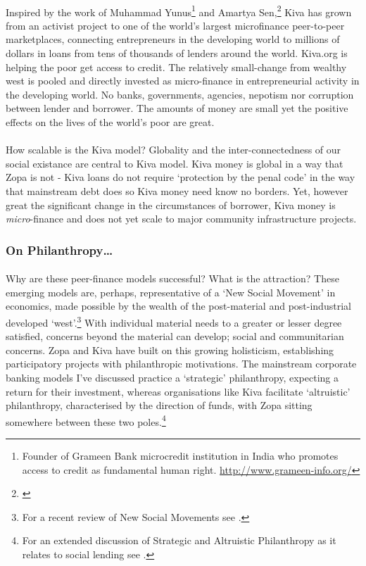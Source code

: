 \documentclass[12pt,a4paper,titlepage]{article}
\begin{document}
\paragraph{}Inspired by the work of Muhammad Yunus\footnote{Founder of Grameen Bank microcredit institution in India who promotes access to credit as fundamental human right. \url{http://www.grameen-info.org/}} and Amartya Sen,\footnote{\cite{sen:1999df}} Kiva has grown from an activist project to one of the world's largest microfinance peer-to-peer marketplaces, connecting entrepreneurs in the developing world to millions of dollars in loans from tens of thousands of lenders around the world. Kiva.org is helping the poor get access to credit. The relatively small-change from wealthy west is pooled and directly invested as micro-finance in entrepreneurial activity in the developing world. No banks, governments, agencies, nepotism nor corruption between lender and borrower. The amounts of money are small yet the positive effects on the lives of the world's poor are great.

\paragraph{}How scalable is the Kiva model? Globality and the inter-connectedness of our social existance are central to Kiva model. Kiva money is global in a way that Zopa is not - Kiva loans do not require `protection by the penal code' in the way that mainstream debt does so Kiva money need know no borders. Yet, however great the significant change in the circumstances of borrower, Kiva money is \textit{micro}-finance and does not yet scale to major community infrastructure projects.

\subsubsection{On Philanthropy\ldots}
\paragraph{}Why are these peer-finance models successful? What is the attraction? These emerging models are, perhaps, representative of a `New Social Movement' in economics, made possible by the wealth of the post-material and post-industrial developed `west'.\footnote{For a recent review of New Social Movements see \cite{Porta:2006kx}.} With individual material needs to a greater or lesser degree satisfied, concerns beyond the material can develop; social and communitarian concerns. Zopa and Kiva have built on this growing holisticism, establishing participatory projects with philanthropic motivations. The mainstream corporate banking models I've discussed practice a `strategic' philanthropy, expecting a return for their investment, whereas organisations like Kiva facilitate `altruistic' philanthropy, characterised by the direction of funds, with Zopa sitting somewhere between these two poles.\footnote{For an extended discussion of Strategic and Altruistic Philanthropy as it relates to social lending see \cite{hulme:2006sl}.}
\end{document}
